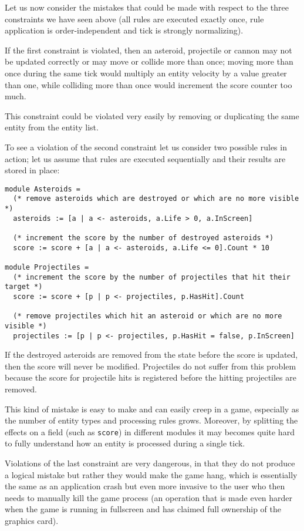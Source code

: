 Let us now consider the mistakes that could be made with respect to the three constraints we have seen above (all rules are executed exactly once, rule application is order-independent and tick is strongly normalizing).

If the first constraint is violated, then an asteroid, projectile or cannon may not be updated correctly or may move or collide more than once; moving more than once during the same tick would multiply an entity velocity by a value greater than one, while colliding more than once would increment the score counter too much.

This constraint could be violated very easily by removing or duplicating the same entity from the entity list.

To see a violation of the second constraint let us consider two possible rules in action; let us assume that rules are executed sequentially and their results are stored in place:

\begin{lstlisting}
module Asteroids =
  (* remove asteroids which are destroyed or which are no more visible *)
  asteroids := [a | a <- asteroids, a.Life > 0, a.InScreen]

  (* increment the score by the number of destroyed asteroids *)
  score := score + [a | a <- asteroids, a.Life <= 0].Count * 10

module Projectiles =
  (* increment the score by the number of projectiles that hit their target *)
  score := score + [p | p <- projectiles, p.HasHit].Count

  (* remove projectiles which hit an asteroid or which are no more visible *)
  projectiles := [p | p <- projectiles, p.HasHit = false, p.InScreen]
\end{lstlisting}

If the destroyed asteroids are removed from the state before the score is updated, then the score will never be modified. Projectiles do not suffer from this problem because the score for projectile hits is registered before the hitting projectiles are removed.

This kind of mistake is easy to make and can easily creep in a game, especially as the number of entity types and processing rules grows. Moreover, by splitting the effects on a field (such as \texttt{score}) in different modules it may becomes quite hard to fully understand how an entity is processed during a single tick.

Violations of the last constraint are very dangerous, in that they do not produce a logical mistake but rather they would make the game hang, which is essentially the same as an application crash but even more invasive to the user who then needs to manually kill the game process (an operation that is made even harder when the game is running in fullscreen and has claimed full ownership of the graphics card).
